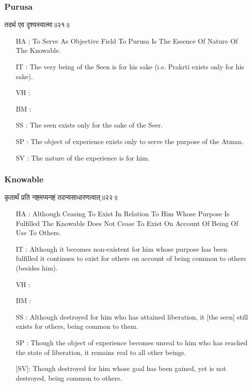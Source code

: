 \begin{frame}[fragile]\frametitle{Purusa}
\begin{sanskrit}
तदर्थ एव दृश्यस्यात्मा॥२१॥
\end{sanskrit}

	\begin{itemize}
	\item [HA]: To Serve As Objective Field To Purusa Is The Essence Of Nature Of The Knowable.
	\item [IT]: The very being of the Seen is for his sake (i.e. Prakrti exists only for his sake).
	\item [VH]: 
	\item [BM]: 
	\item [SS]: The seen exists only for the sake of the Seer.
	\item [SP]: The object of experience exists only to serve the purpose of the Atman.
	\item [SV]: The nature of the experience is for him. 
	\end{itemize}
\end{frame}


\begin{frame}[fragile]\frametitle{Knowable}
\begin{sanskrit}
कृतार्थं प्रति नष्टमप्यनष्टं तदन्यसाधारणत्वात्॥२२॥
\end{sanskrit}

	\begin{itemize}
	\item [HA]: Although Ceasing To Exist In Relation To Him Whose Purpose Is Fulfilled The Knowable Does Not Cease To Exist On Account Of Being Of Use To Others.
	\item [IT]: Although it becomes non-existent for him whose purpose has been fulfilled it continues to exist for others on account of being common to others (besides him).
	\item [VH]: 
	\item [BM]: 
	\item [SS]: Although destroyed for him who has attained liberation, it [the seen] still exists for others, being common to them.
	\item [SP]: Though the object of experience becomes unreal to him who has reached the state of liberation, it remains real to all other beings.

[SV]: Though destroyed for him whose goal has been gained, yet is not destroyed, being common to others. 
	\end{itemize}
\end{frame}


